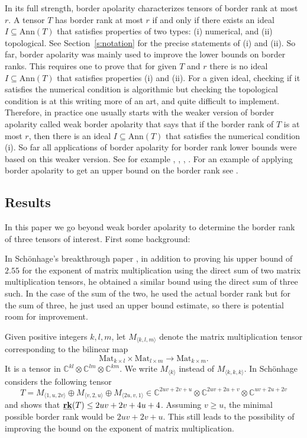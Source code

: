 \documentclass[12pt]{amsart}
\theoremstyle{definition}
\theoremstyle{remark}
\theoremstyle{definition}
\newcommand{\brk}{{\underline{{\bf rk}}}}
\newcommand{\CC}{\mathbb{C}}
\newcommand{\Ann}{\mathrm{Ann}}
\begin{document}
In its full strength, border apolarity characterizes tensors of border rank at most $r$. A tensor $T$ has border rank at most $r$ if and only if there exists an ideal $I\subseteq \Ann(T)$ that satisfies properties of two types: (i) numerical, and (ii) topological. See Section~\ref{s:notation} for the precise statements of (i) and (ii). So far, border apolarity was mainly used to improve the lower bounds on border ranks. This requires one to prove that for given $T$ and $r$ there is no ideal $I\subseteq \Ann(T)$ that satisfies properties (i) and (ii).
For a given ideal, checking if it satisfies the numerical condition is algorithmic but checking the topological condition is at this writing more of an art, and quite difficult to implement. Therefore, in practice one usually starts with the weaker version of border apolarity called weak border apolarity that says that if the border rank of $T$ is at most $r$, then there is an ideal $I\subseteq \Ann(T)$ that satisfies the numerical condition (i). So far all applications of border apolarity for border rank lower bounds were based on this weaker version. See for example \cite{Bar22}, \cite{chl19}, \cite{chl23}, \cite{Fla23}. For an example of applying border apolarity to get an upper bound on the border rank see \cite{KLSS}.


\subsection{Results}
In this paper we go beyond weak border apolarity to determine the border rank of three
tensors of interest. First some background:

In Sch\"onhage's breakthrough paper \cite{Sch81}, in addition to proving his upper bound of $2.55$
for the exponent of matrix multiplication using the direct sum of two matrix multiplication tensors, he obtained
a similar bound using the direct sum of three such. In the case of the sum of the two, he used
  the actual border rank but for the sum of three, he just used an upper bound estimate, so there
 is potential room for improvement.

Given positive integers $k,l,m$, let $M_{\langle k,l,m\rangle}$ denote the matrix multiplication tensor corresponding to the bilinear map
\[
\mathrm{Mat}_{k\times l} \times \mathrm{Mat}_{l\times m} \to \mathrm{Mat}_{k\times m}.
\]
It is a tensor in $\CC^{kl}\otimes \CC^{lm}\otimes \CC^{km}$. We write $M_{\langle k\rangle}$ instead of $M_{\langle k,k,k\rangle}$.
In \cite[Section~8]{Sch81} Sch\"onhage considers the following tensor 
\begin{equation}\label{eq:SchonhageTensor}
T=M_{\langle 1, u, 2v\rangle}  \oplus M_{\langle v,2,u\rangle} \oplus M_{\langle 2u,v,1\rangle} \in \CC^{2uv+2v+u}\otimes \CC^{2uv+2u+v}\otimes \CC^{uv+2u+2v}
\end{equation}
 and shows that $\brk(T) \le 2uv+2v+4u+4$.
Assuming $v\geq u$, the minimal possible border rank would be $2uv+2v+u$. This still leads to the possibility of improving the bound on the exponent of matrix multiplication.
\end{document}
